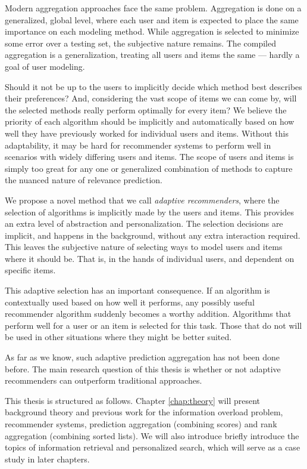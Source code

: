 Modern aggregation approaches face the same problem. 
Aggregation is done on a generalized, global level,
where each user and item is expected to place the same importance on each modeling method.
While aggregation is selected to minimize some error over a testing set,
the subjective nature remains. The compiled aggregation is a generalization,
treating all users and items the same --- hardly a goal of user modeling.

Should it not be up to the users to implicitly decide which method best describes their preferences?
And, considering the vast scope of items we can come by, will the selected
methods really perform optimally for every item?
We believe the priority of each algorithm should be implicitly and automatically
based on how well they have previously worked for individual users and items.
Without this adaptability, it may be hard for recommender systems
to perform well in scenarios with widely differing users and items.
The scope of users and items is simply too great for any one or generalized combination
of methods to capture the nuanced nature of relevance prediction.

We propose a novel method that we call \emph{adaptive recommenders}, 
where the selection of algorithms is implicitly made by the users and items.
This provides an extra level of abstraction and personalization.
The selection decisions are implicit, and happens in the background, without any extra interaction required.
This leaves the subjective nature of selecting ways to model users and items where it should be.
That is, in the hands of individual users, and dependent on specific items.

This adaptive selection has an important consequence. 
If an algorithm is contextually used based on how well it performs,
any possibly useful recommender algorithm suddenly becomes a worthy addition.
Algorithms that perform well for a user or an item is selected for this task.
Those that do not will be used in other situations where they might be better suited.

As far as we know, such adaptive prediction aggregation has not been done before.
The main research question of this thesis is whether or not adaptive recommenders
can outperform traditional approaches.

\hr

\noindent
This thesis is structured as follows.
Chapter \ref{chap:theory} will present background theory and previous work for
the information overload problem, recommender systems, 
prediction aggregation (combining scores) and rank aggregation (combining sorted lists). 
We will also introduce briefly introduce the topics of information
retrieval and personalized search, which will serve
as a case study in later chapters.

